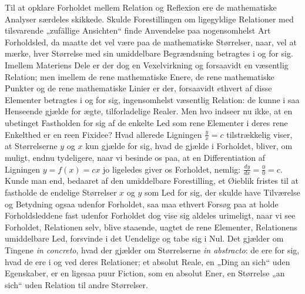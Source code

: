 \documentclass[11pt]{book}
\newcommand{\opage}[1]{\marginnote{\footnotesize\textit{[#1]}}}
\begin{document}
Til at opklare Forholdet mellem Relation og Reflexion ere de mathematiske Analyser særdeles skikkede. Skulde Forestillingen om ligegyldige Relationer med tilsvarende „zufällige Ansichten“ finde Anvendelse paa nogensomhelst Art Forholdsled, da maatte det vel være paa de mathematiske Størrelser, naar, vel at mærke, hver Størrelse med sin umiddelbare Begrændsning betragtes i og for sig. Imellem Materiens Dele er der dog en Vexelvirkning og forsaavidt en væsentlig Relation; men imellem de rene mathematiske Enere, de rene mathematiske Punkter og de rene mathematiske Linier er der, forsaavidt ethvert af disse Elementer betragtes i og for sig, ingensomhelst væsentlig Relation: de kunne i saa Henseende gjælde for ægte, tilforladelige Realer. Men hvo indseer nu ikke, at en ubetinget Fastholden for sig af de enkelte Led som rene Elementer i deres rene Enkelthed er en reen Fixidee? Hvad allerede Ligningen $\frac{y}{x} = c$ tilstrækkelig viser, at Størrelserne $y$ og $x$ kun gjælde for sig, hvad de gjælde i Forholdet, bliver, om muligt, endnu tydeligere, naar vi besinde os paa, at en Differentiation af Ligningen $y = f(x) = cx$ jo ligeledes giver os Forholdet, nemlig: $\frac{dy}{dx} = \frac{0}{0} = c$. Kunde man end,
\opage{74} \setcounter{footnote}{0}%
bedaaret af den umiddelbare Forestilling, et Øieblik fristes til at fastholde de endelige Størrelser $x$ og $y$ som Led for sig, der skulde have Tilværelse og Betydning ogsaa udenfor Forholdet, saa maa ethvert Forsøg paa at holde Forholdsleddene fast udenfor Forholdet dog vise sig aldeles urimeligt, naar vi see Forholdet, Relationen selv, blive staaende, uagtet de rene Elementer, Relationens umiddelbare Led, forsvinde i det Uendelige og tabe sig i Nul. Det gjælder om Tingene \textit{in concreto}, hvad der gjælder om Størrelserne \textit{in abstracto}: de ere for sig, hvad de ere i og ved deres Relationer; et absolut Reale, en „Ding an sich“ uden Egenskaber, er en ligesaa puur Fiction, som en absolut Ener, en Størrelse „an sich“ uden Relation til andre Størrelser.
\end{document}
